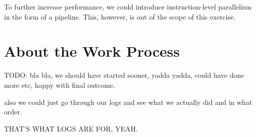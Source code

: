 To further increase performance, we could introduce instruction-level parallelism in the form of a pipeline.
This, however, is out of the scope of this exercise.


\section{About the Work Process}

TODO: bla bla, we should have started sooner, yadda yadda, could have done more etc, happy with final outcome.

also we could just go through our logs and see what we actually did and in what order.

THAT'S WHAT LOGS ARE FOR, YEAH.
